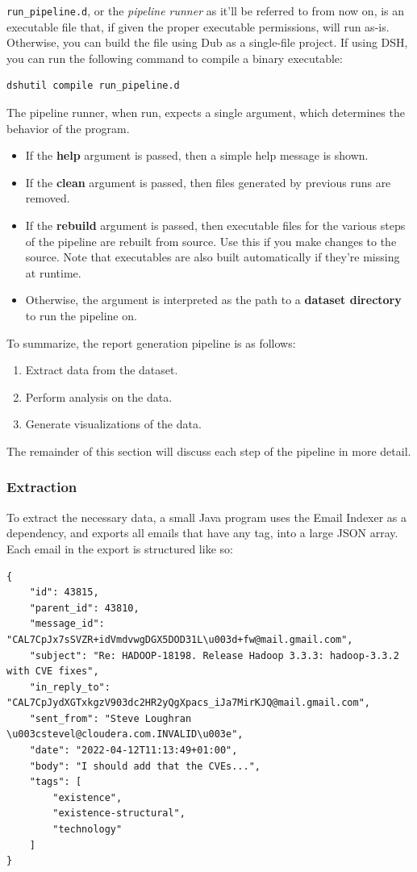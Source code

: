 \documentclass[a4paper, 12pt]{article}
\begin{document}
		\texttt{run\_pipeline.d}, or the \textit{pipeline runner} as it'll be referred to from now on, is an executable file that, if given the proper executable permissions, will run as-is. Otherwise, you can build the file using Dub as a single-file project. If using DSH, you can run the following command to compile a binary executable:
		
		\begin{verbatim}
dshutil compile run_pipeline.d
		\end{verbatim}
	
		The pipeline runner, when run, expects a single argument, which determines the behavior of the program.
		
		\begin{itemize}
			\item If the \textbf{help} argument is passed, then a simple help message is shown.
			\item If the \textbf{clean} argument is passed, then files generated by previous runs are removed.
			\item If the \textbf{rebuild} argument is passed, then executable files for the various steps of the pipeline are rebuilt from source. Use this if you make changes to the source. Note that executables are also built automatically if they're missing at runtime.
			\item Otherwise, the argument is interpreted as the path to a \textbf{dataset directory} to run the pipeline on.
		\end{itemize}
		
		To summarize, the report generation pipeline is as follows:
		\begin{enumerate}
			\item Extract data from the dataset.
			\item Perform analysis on the data.
			\item Generate visualizations of the data.
		\end{enumerate}
		
		The remainder of this section will discuss each step of the pipeline in more detail.
		
		\newpage
		\subsubsection{Extraction}
			To extract the necessary data, a small Java program uses the Email Indexer as a dependency, and exports all emails that have any tag, into a large JSON array. Each email in the export is structured like so:
			\begin{verbatim}
{
	"id": 43815,
	"parent_id": 43810,
	"message_id": "CAL7CpJx7sSVZR+idVmdvwgDGX5DOD31L\u003d+fw@mail.gmail.com",
	"subject": "Re: HADOOP-18198. Release Hadoop 3.3.3: hadoop-3.3.2 with CVE fixes",
	"in_reply_to": "CAL7CpJydXGTxkgzV903dc2HR2yQgXpacs_iJa7MirKJQ@mail.gmail.com",
	"sent_from": "Steve Loughran \u003cstevel@cloudera.com.INVALID\u003e",
	"date": "2022-04-12T11:13:49+01:00",
	"body": "I should add that the CVEs...",
	"tags": [
		"existence",
		"existence-structural",
		"technology"
	]
}
			\end{verbatim}
			
\end{document}
